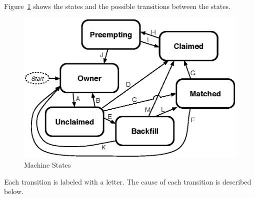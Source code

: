 Figure~\ref{fig:machine-states} shows
the states and the possible transitions between the states.

\begin{figure}[hbt]
\centering
\includegraphics{admin-man/machine-states.eps}
\caption{\label{fig:machine-states}Machine States}
\end{figure}

Each transition is labeled with a letter.
The cause of each transition is described below.


